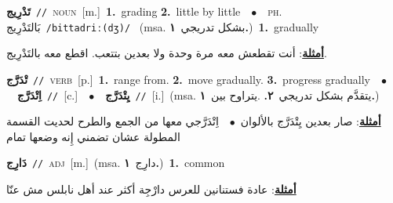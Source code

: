 \documentclass[10pt,a4paper,twoside]{article} %
\begin{document}
\begin{multicols}{2}
{\setlength\topsep{0pt}\textbf{\foreignlanguage{arabic}{تَدْرِيج}}\ {\color{gray}\texttt{//}\color{black}}\ \textsc{noun}\ [m.]\ \textbf{1.}~grading  \textbf{2.}~little by little\ \ $\bullet$\ \ \textsc{ph.} \color{gray} \foreignlanguage{arabic}{بَالتَدْرِيج}\color{black}\ {\color{gray}\texttt{/{\sffamily bittadriː(dʒ)}/}\color{black}}\ \color{gray} (msa. \foreignlanguage{arabic}{بشكل تدريجي}~\foreignlanguage{arabic}{\textbf{١.}})\color{black}\ \textbf{1.}~gradually\  \begin{flushright}\color{gray}\foreignlanguage{arabic}{\textbf{\underline{\foreignlanguage{arabic}{أمثلة}}}: أنت تقطعش معه مرة وحدة ولا بعدين بتتعب. اقطع معه بالتَدْرِيج.}\end{flushright}\color{black}} \vspace{2mm}

{\setlength\topsep{0pt}\textbf{\foreignlanguage{arabic}{تْدَرَّج}}\ {\color{gray}\texttt{//}\color{black}}\ \textsc{verb}\ [p.]\ \textbf{1.}~range from.  \textbf{2.}~move gradually.  \textbf{3.}~progress gradually\ \ $\bullet$\ \ \setlength\topsep{0pt}\textbf{\foreignlanguage{arabic}{اِتْدَرَّج}}\ {\color{gray}\texttt{//}\color{black}}\ [c.]\ \ $\bullet$\ \ \setlength\topsep{0pt}\textbf{\foreignlanguage{arabic}{يِتْدَرَّج}}\ {\color{gray}\texttt{//}\color{black}}\ [i.]\ \color{gray}(msa. \foreignlanguage{arabic}{يتقدَّم بشكل تدريجي}~\foreignlanguage{arabic}{\textbf{٢.}}  .\foreignlanguage{arabic}{يتراوح بين}~\foreignlanguage{arabic}{\textbf{١.}})\color{black}\  \begin{flushright}\color{gray}\foreignlanguage{arabic}{\textbf{\underline{\foreignlanguage{arabic}{أمثلة}}}: صار بعدين يِتْدَرَّج بالألوان\ $\bullet$\ \  اِتْدَرَّجي معها من الجمع والطرح لحديت القسمة المطولة عشان تضمني إِنه وضعها تمام}\end{flushright}\color{black}} \vspace{2mm}

{\setlength\topsep{0pt}\textbf{\foreignlanguage{arabic}{دَارِج}}\ {\color{gray}\texttt{//}\color{black}}\ \textsc{adj}\ [m.]\ \color{gray}(msa. \foreignlanguage{arabic}{دارِج}~\foreignlanguage{arabic}{\textbf{١.}})\color{black}\ \textbf{1.}~common\  \begin{flushright}\color{gray}\foreignlanguage{arabic}{\textbf{\underline{\foreignlanguage{arabic}{أمثلة}}}: عادة فستنانين للعرس دارْجِة أكثر عند أهل نابلس مش عنّا}\end{flushright}\color{black}} \vspace{2mm}


\end{multicols}
\end{document}
